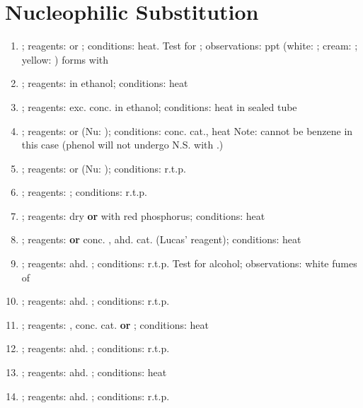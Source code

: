 \section{Nucleophilic Substitution}
\begin{enumerate}
    \item {}; reagents:  or ; conditions: heat. Test for ; observations: ppt (white: ; cream: ; yellow: ) forms with 
    \item {}; reagents:  in ethanol; conditions: heat
    \item {}; reagents: exc. conc.  in ethanol; conditions: heat in sealed tube
    \item {}; reagents:  or  (Nu: ); conditions: conc.  cat., heat
    Note:  cannot be benzene in this case (phenol will not undergo N.S. with .)
    \item {}; reagents:  or  (Nu: ); conditions: r.t.p.
    \item {}; reagents: ; conditions: r.t.p.
    \item {}; reagents: dry  \textbf{or}  with red phosphorus; conditions: heat
    \item {}; reagents:  \textbf{or} conc. , ahd.  cat. (Lucas' reagent); conditions: heat
    \item {}; reagents: ahd. ; conditions: r.t.p. Test for alcohol; observations: white fumes of 
    \item {}; reagents: ahd. ; conditions: r.t.p.
    \item {}; reagents: , conc.  cat. \textbf{or} ; conditions: heat
    \item {}; reagents: ahd. ; conditions: r.t.p.
    \item {}; reagents: ahd. ; conditions: heat
    \item {}; reagents: ahd. ; conditions: r.t.p.
\end{enumerate}
